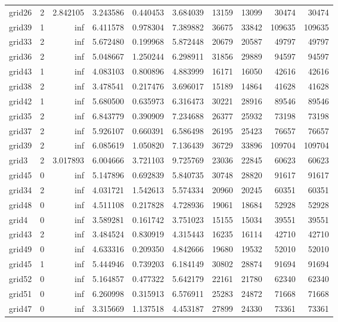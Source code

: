 \begin{longtable}{|l|r|r|r|r|r|r|r|r|r|}
grid26 & 2 & 2.842105 & 3.243586 & 0.440453 & 3.684039 & 13159 & 13099 & 30474 & 30474 \\
grid39 & 1 & inf & 6.411578 & 0.978304 & 7.389882 & 36675 & 33842 & 109635 & 109635 \\
grid33 & 2 & inf & 5.672480 & 0.199968 & 5.872448 & 20679 & 20587 & 49797 & 49797 \\
grid36 & 2 & inf & 5.048667 & 1.250244 & 6.298911 & 31856 & 29889 & 94597 & 94597 \\
grid43 & 1 & inf & 4.083103 & 0.800896 & 4.883999 & 16171 & 16050 & 42616 & 42616 \\
grid38 & 2 & inf & 3.478541 & 0.217476 & 3.696017 & 15189 & 14864 & 41628 & 41628 \\
grid42 & 1 & inf & 5.680500 & 0.635973 & 6.316473 & 30221 & 28916 & 89546 & 89546 \\
grid35 & 2 & inf & 6.843779 & 0.390909 & 7.234688 & 26377 & 25932 & 73198 & 73198 \\
grid37 & 2 & inf & 5.926107 & 0.660391 & 6.586498 & 26195 & 25423 & 76657 & 76657 \\
grid39 & 2 & inf & 6.085619 & 1.050820 & 7.136439 & 36729 & 33896 & 109704 & 109704 \\
grid3 & 2 & 3.017893 & 6.004666 & 3.721103 & 9.725769 & 23036 & 22845 & 60623 & 60623 \\
grid45 & 0 & inf & 5.147896 & 0.692839 & 5.840735 & 30748 & 28820 & 91617 & 91617 \\
grid34 & 2 & inf & 4.031721 & 1.542613 & 5.574334 & 20960 & 20245 & 60351 & 60351 \\
grid48 & 0 & inf & 4.511108 & 0.217828 & 4.728936 & 19061 & 18684 & 52928 & 52928 \\
grid4 & 0 & inf & 3.589281 & 0.161742 & 3.751023 & 15155 & 15034 & 39551 & 39551 \\
grid43 & 2 & inf & 3.484524 & 0.830919 & 4.315443 & 16235 & 16114 & 42710 & 42710 \\
grid49 & 0 & inf & 4.633316 & 0.209350 & 4.842666 & 19680 & 19532 & 52010 & 52010 \\
grid45 & 1 & inf & 5.444946 & 0.739203 & 6.184149 & 30802 & 28874 & 91694 & 91694 \\
grid52 & 0 & inf & 5.164857 & 0.477322 & 5.642179 & 22161 & 21780 & 62340 & 62340 \\
grid51 & 0 & inf & 6.260998 & 0.315913 & 6.576911 & 25283 & 24872 & 71668 & 71668 \\
grid47 & 0 & inf & 3.315669 & 1.137518 & 4.453187 & 27899 & 24330 & 73361 & 73361 \\

\end{longtable}
